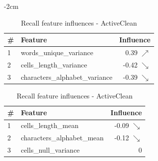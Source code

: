 \begin{table}[H]
	\centering
	\addtolength{\leftskip} {-2cm}
	\addtolength{\rightskip}{-2cm}
	\captionsetup[subtable]{position = below}
	\captionsetup[table]{position=top}
	\caption{Top feature influences - ActiveClean}
	\label{tab:feature_influences_ActiveClean}
		\begin{subtable}{0.5\linewidth}
		\centering
		\begin{tabular}{llr}
\toprule
 \# &                         Feature &         Influence \\
\midrule
 1 &         words\_unique\_variance &   0.39 $\nearrow$ \\
 2 &         cells\_length\_variance &  -0.42 $\searrow$ \\
 3 &  characters\_alphabet\_variance &  -0.39 $\searrow$ \\
\bottomrule
\end{tabular}
		\caption{Precision feature influences - ActiveClean}
		\label{tab:prec_feature_influences_ActiveClean}
	\end{subtable}
	\hspace*{4em}
	\begin{subtable}{0.5\linewidth}
		\centering
		\begin{tabular}{llr}
\toprule
 \# &                     Feature &         Influence \\
\midrule
 1 &         cells\_length\_mean &  -0.09 $\searrow$ \\
 2 &  characters\_alphabet\_mean &  -0.12 $\searrow$ \\
 3 &       cells\_null\_variance &                 0 \\
\bottomrule
\end{tabular}
		\caption{Recall feature influences - ActiveClean}
		\label{tab:rec_feature_influences_ActiveClean}
	\end{subtable}%
\end{table}



